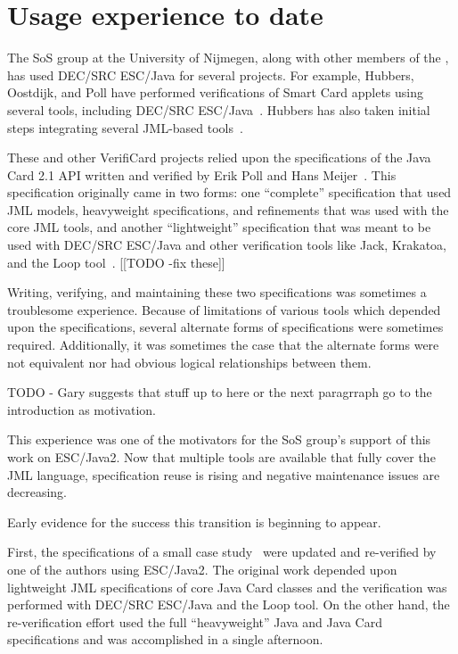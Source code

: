 \documentclass{sig-alternate}
\begin{document}
\section{Usage experience to date}
The SoS group at the University of Nijmegen, along with other members
of the , has used DEC/SRC ESC/Java for several projects.  For
example, Hubbers, Oostdijk, and Poll have performed verifications of
Smart Card applets using several tools, including DEC/SRC
ESC/Java~\cite{HOP04}.  Hubbers has also taken initial steps
integrating several JML-based tools~\cite{Hub03}.

These and other VerifiCard projects relied upon the specifications of
the Java Card 2.1 API written and verified by Erik Poll and Hans
Meijer~\cite{MeijerPoll01}.  This specification originally came in two
forms: one ``complete'' specification that used JML models,
heavyweight specifications, and refinements that was used with the
core JML tools, and another ``lightweight'' specification that was
meant to be used with DEC/SRC ESC/Java and other verification tools
like Jack, Krakatoa, and the Loop tool~\cite{a,b,c}.  [[TODO -fix these]]

Writing, verifying, and maintaining these two specifications was
sometimes a troublesome experience.  Because of limitations of various
tools which depended upon the specifications, several alternate forms
of specifications were sometimes required.  Additionally, it was
sometimes the case that the alternate forms were not equivalent nor
had obvious logical relationships between them.

TODO - Gary suggests that stuff up to here or the next paragrraph go to the introduction as motivation.

This experience was one of the motivators for the SoS group's support
of this work on ESC/Java2.  Now that multiple tools are available that
fully cover the JML language, specification reuse is rising and
negative maintenance issues are decreasing.  

Early evidence for the success this transition is beginning to appear.

First, the specifications of a small case
study~\cite{BreunesseJacobsBerg02} were updated and re-verified by one
of the authors using ESC/Java2.  The original work depended upon
lightweight JML specifications of core Java Card classes and the
verification was performed with DEC/SRC ESC/Java and the Loop tool.
On the other hand, the re-verification effort used the full
``heavyweight'' Java and Java Card specifications and was accomplished
in a single afternoon.
\end{document}
